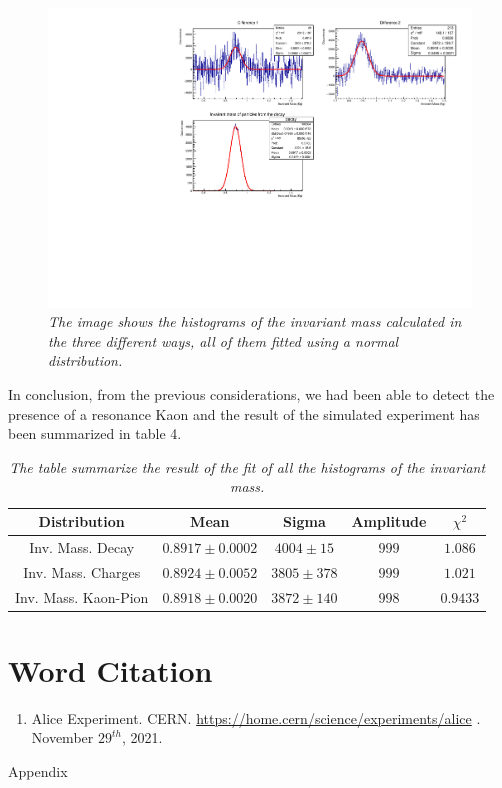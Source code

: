 \documentclass[a4paper, 11pt]{article}
\begin{document}
    \begin{figure}[h!]
      \includegraphics[width=.8\linewidth]{cam.pdf}
      \caption{\label{f3}\textit{The image shows the histograms of the invariant mass calculated in the three different ways, all of them fitted using a normal distribution.}}
    \end{figure}
    In conclusion, from the previous considerations, we had been able to detect the presence of a resonance Kaon and the result of the simulated experiment has been summarized in table 4.
    \begin{table}[h!]
      \centering
      \begin{tabular}{ c | c c c c }
        \hline
        Distribution & Mean & Sigma & Amplitude & $\chi^2$ \\
        \hline
        Inv. Mass. Decay & $0.8917\pm0.0002$ & $4004\pm15$ & $999$ & $1.086$\\
        Inv. Mass. Charges & $0.8924\pm0.0052$ & $3805\pm378$ & $999$ & $1.021$\\
        Inv. Mass. Kaon-Pion & $0.8918\pm0.0020$ & $3872\pm140$ & $998$ & $0.9433$ \\
        \hline
      \end{tabular}
      \caption{ \label{Table 4}
      \textit{The table summarize the result of the fit of all the histograms of the invariant mass.}
      }
    \end{table}

    \section* {Word Citation}
    \begin{enumerate}
      \item{Alice Experiment. CERN. \url{https://home.cern/science/experiments/alice} . November $29^{th}$, 2021.}
    \end{enumerate}
    \newpage
    \begin{center}
      \Huge Appendix
    \end{center}
\end{document}

